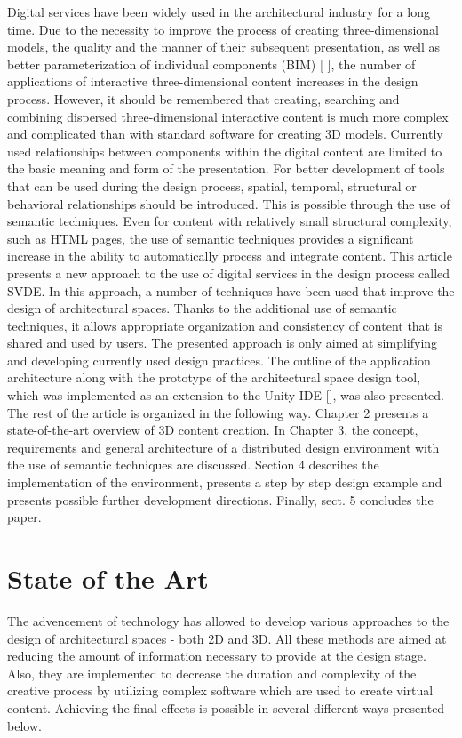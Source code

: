 \documentclass[runningheads]{llncs}
\begin{document}
Digital services have been widely used in the architectural industry for a long time. Due to the necessity to improve the process of creating three-dimensional models, the quality and the manner of their subsequent presentation, as well as better parameterization of individual components (BIM) [ ], the number of applications of interactive three-dimensional content increases in the design process. However, it should be remembered that creating, searching and combining dispersed three-dimensional interactive content is much more complex and complicated than with standard software for creating 3D models. Currently used relationships between components within the digital content are limited to the basic meaning and form of the presentation. For better development of tools that can be used during the design process, spatial, temporal, structural or behavioral relationships should be introduced. This is possible through the use of semantic techniques. Even for content with relatively small structural complexity, such as HTML pages, the use of semantic techniques provides a significant increase in the ability to automatically process and integrate content.
This article presents a new approach to the use of digital services in the design process called SVDE. In this approach, a number of techniques have been used that improve the design of architectural spaces. Thanks to the additional use of semantic techniques, it allows appropriate organization and consistency of content that is shared and used by users. The presented approach is only aimed at simplifying and developing currently used design practices. The outline of the application architecture along with the prototype of the architectural space design tool, which was implemented as an extension to the Unity IDE [], was also presented.
The rest of the article is organized in the following way. Chapter 2 presents a state-of-the-art overview of 3D content creation. In Chapter 3, the concept, requirements and general architecture of a distributed design environment with the use of semantic techniques are discussed. Section 4 describes the implementation of the environment, presents a step by step design example and presents possible further development directions.
Finally, sect. 5 concludes the paper.

\section{State of the Art}
The advencement of technology has allowed to develop various approaches to the design of architectural spaces - both 2D and 3D. All these methods are aimed at reducing the amount of information necessary to provide at the design stage. Also, they are implemented to decrease the duration and complexity of the creative process by utilizing complex software which are used to create virtual content. Achieving the final effects is possible in several different ways presented below.
\end{document}
